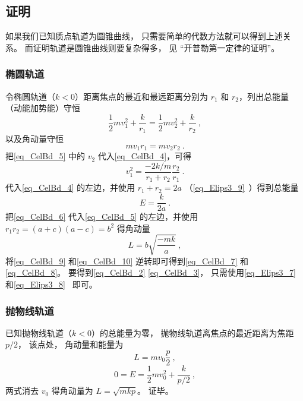 \subsection{证明}
如果我们已知质点轨道为圆锥曲线， 只需要简单的代数方法就可以得到上述关系。 而证明轨道是圆锥曲线则要复杂得多， 见 “开普勒第一定律的证明”。

\subsubsection{椭圆轨道}
令椭圆轨道（$k<0$）距离焦点的最近和最远距离分别为 $r_1$ 和 $r_2$，列出总能量（动能加势能）守恒
\begin{equation}\label{eq_CelBd_4}
\frac12 m v_1^2 + \frac{k}{r_1} = \frac12 mv_2^2 + \frac{k}{r_2}~,
\end{equation}
以及角动量守恒
\begin{equation}\label{eq_CelBd_5}
mv_1 r_1 = mv_2 r_2~.
\end{equation}
把\autoref{eq_CelBd_5} 中的 $v_2$ 代入\autoref{eq_CelBd_4}，可得
\begin{equation}\label{eq_CelBd_6}
v_1^2 = \frac{-2k/m}{r_1 + r_2} \frac{r_2}{r_1}~.
\end{equation}
代入\autoref{eq_CelBd_4} 的左边，并使用 $r_1+r_2=2a$ （\autoref{eq_Elips3_9}~）得到总能量
\begin{equation}\label{eq_CelBd_9}
E = \frac{k}{2a}~.
\end{equation}
把\autoref{eq_CelBd_6} 代入\autoref{eq_CelBd_5} 的左边，并使用 $r_1 r_2 = (a+c)(a-c) =b^2$ %
得角动量
\begin{equation}\label{eq_CelBd_10}
L = b\sqrt{\frac{-mk}{a}}~,
\end{equation}
将\autoref{eq_CelBd_9} 和\autoref{eq_CelBd_10} 逆转即可得到\autoref{eq_CelBd_7} 和\autoref{eq_CelBd_8}。 要得到\autoref{eq_CelBd_2} \autoref{eq_CelBd_3}， 只需使用\autoref{eq_Elips3_7}~ 和\autoref{eq_Elips3_8}~ 即可。

\subsubsection{抛物线轨道}
已知抛物线轨道（$k<0$）的总能量为零， 抛物线轨道离焦点的最近距离为焦距 $p/2$， 该点处， 角动量和能量为
\begin{equation}
L = mv_0 \frac p2~,
\end{equation}
\begin{equation}
0 = E = \frac 12 mv_0^2 + \frac{k}{p/2}~,
\end{equation}
两式消去 $v_0$ 得角动量为 $L = \sqrt{mkp}$。 证毕。

